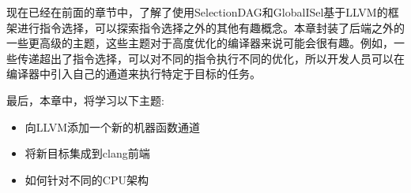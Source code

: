 现在已经在前面的章节中，了解了使用SelectionDAG和GlobalISel基于LLVM的框架进行指令选择，可以探索指令选择之外的其他有趣概念。本章封装了后端之外的一些更高级的主题，这些主题对于高度优化的编译器来说可能会很有趣。例如，一些传递超出了指令选择，可以对不同的指令执行不同的优化，所以开发人员可以在编译器中引入自己的通道来执行特定于目标的任务。

最后，本章中，将学习以下主题:

\begin{itemize}
\item
向LLVM添加一个新的机器函数通道

\item
将新目标集成到clang前端

\item
如何针对不同的CPU架构
\end{itemize}


















